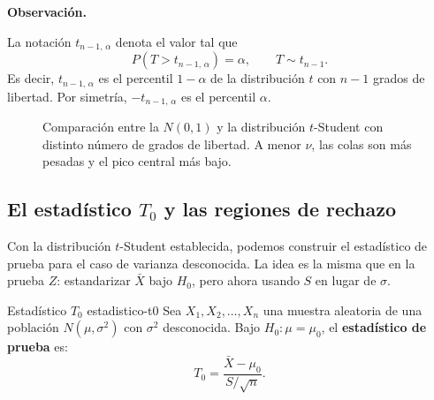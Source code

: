 \documentclass[12pt, a4paper]{book}
\newenvironment{observacion}{%
    \par\medskip\noindent\textbf{\color{azul}Observaci\'{o}n.}\enspace\itshape
}{\par\medskip}
\numberwithin{equation}{chapter}
\begin{document}
\begin{observacion}
	La notaci\'{o}n $t_{n-1,\,\alpha}$ denota
	el valor tal que
	\[
	P(T > t_{n-1,\,\alpha}) = \alpha,
	\qquad T \sim t_{n-1}.
	\]
	Es decir, $t_{n-1,\,\alpha}$ es el percentil
	$1-\alpha$ de la distribuci\'{o}n $t$ con
	$n-1$ grados de libertad. Por simetr\'{i}a,
	$-t_{n-1,\,\alpha}$ es el percentil $\alpha$.
\end{observacion}

\begin{figure}[H]
	\centering
	\caption{Comparaci\'{o}n entre la $N(0,1)$ y
		la distribuci\'{o}n $t$-Student con distinto
		n\'{u}mero de grados de libertad. A menor
		$\nu$, las colas son m\'{a}s pesadas y el
		pico central m\'{a}s bajo.}
	\label{fig:t-student}
\end{figure}

\subsection{El estad\'{i}stico $T_0$ y las
	regiones de rechazo}

Con la distribuci\'{o}n $t$-Student establecida,
podemos construir el estad\'{i}stico de prueba
para el caso de varianza desconocida. La idea
es la misma que en la prueba $Z$: estandarizar
$\bar{X}$ bajo $H_0$, pero ahora usando $S$
en lugar de $\sigma$.

\begin{definicion}{Estad\'{i}stico $T_0$}
	{estadistico-t0}
	Sea $X_1, X_2, \ldots, X_n$ una muestra
	aleatoria de una poblaci\'{o}n
	$N(\mu, \sigma^2)$ con $\sigma^2$
	desconocida. Bajo $H_0: \mu = \mu_0$,
	el \textbf{estad\'{i}stico de prueba}
	es:
	\[
	T_0 = \frac{\bar{X} - \mu_0}
	{S / \sqrt{n}}.
	\]
\end{definicion}
\end{document}
